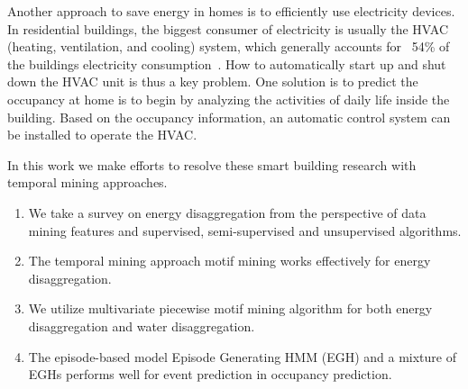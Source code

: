 Another approach to save energy in homes is to 
efficiently use electricity devices.  
In residential buildings, 
the biggest consumer of electricity is usually the HVAC 
(heating, ventilation, and cooling) system, which generally accounts for ~54\% 
of the buildings electricity consumption~\cite{book2014us}. 
How to automatically start up and shut down the HVAC unit 
is thus a key problem. 
One solution is to predict the occupancy at home 
is to begin by analyzing the activities of daily life 
inside the building. 
Based on the occupancy information, 
an automatic control system can be installed
to operate the HVAC. 

In this work we make efforts to resolve these smart building research with 
temporal mining approaches.
\begin{enumerate}
	\item We take a survey on energy disaggregation from the perspective of data mining features and supervised, semi-supervised and unsupervised algorithms. 
	\item The temporal mining approach motif mining works effectively for energy disaggregation. 
	\item We utilize multivariate piecewise motif mining algorithm for both energy disaggregation and water disaggregation. 
	\item The episode-based model Episode Generating HMM (EGH) and a mixture of EGHs performs well for event prediction in occupancy prediction. 
\end{enumerate}





